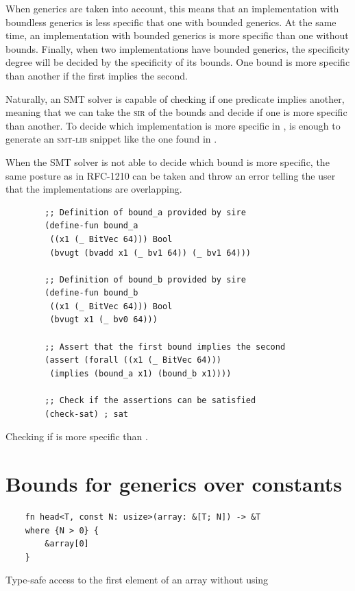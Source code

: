 When generics are taken into account, this means that an implementation with
boundless generics is less specific that one with bounded generics. At the same
time, an implementation with bounded generics is more specific than one without
bounds. Finally, when two implementations have bounded generics, the
specificity degree will be decided by the specificity of its bounds. One bound
is more specific than another if the first implies the second.

Naturally, an SMT solver is capable of checking if one predicate implies
another, meaning that we can take the \textsc{sir} of the bounds and decide if
one is more specific than another. To decide which implementation is more
specific in , is enough to generate an
\textsc{smt-lib} snippet like the one found in .

When the SMT solver is not able to decide which bound is more specific, the
same posture as in RFC-1210 can be taken and throw an error telling the user
that the implementations are overlapping.

\begin{listing}[h]
	\begin{verbatim}
        ;; Definition of bound_a provided by sire
        (define-fun bound_a
         ((x1 (_ BitVec 64))) Bool 
         (bvugt (bvadd x1 (_ bv1 64)) (_ bv1 64)))

        ;; Definition of bound_b provided by sire
        (define-fun bound_b 
         ((x1 (_ BitVec 64))) Bool 
         (bvugt x1 (_ bv0 64)))

        ;; Assert that the first bound implies the second
        (assert (forall ((x1 (_ BitVec 64))) 
         (implies (bound_a x1) (bound_b x1))))

        ;; Check if the assertions can be satisfied
        (check-sat) ; sat
	\end{verbatim}
    \caption{Checking if  is more specific than .}
  \label{lst:trait_spec_smt}
\end{listing}

\section{Bounds for generics over constants}

\begin{listing}[h]
	\begin{verbatim}
    fn head<T, const N: usize>(array: &[T; N]) -> &T
    where {N > 0} {
        &array[0]
    }
    \end{verbatim}
    \caption{Type-safe access to the first element of an array without using
    }
  \label{lst:head_const_generics}
\end{listing}
